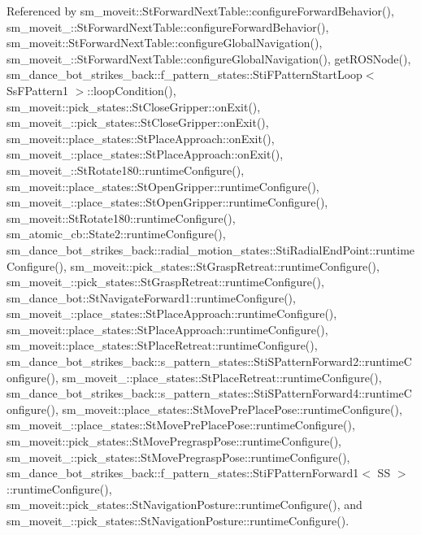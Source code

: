 Referenced by sm\+\_\+moveit\+::\+St\+Forward\+Next\+Table\+::configure\+Forward\+Behavior(), sm\+\_\+moveit\+\_\+::\+St\+Forward\+Next\+Table\+::configure\+Forward\+Behavior(), sm\+\_\+moveit\+::\+St\+Forward\+Next\+Table\+::configure\+Global\+Navigation(), sm\+\_\+moveit\+\_\+::\+St\+Forward\+Next\+Table\+::configure\+Global\+Navigation(), get\+R\+O\+S\+Node(), sm\+\_\+dance\+\_\+bot\+\_\+strikes\+\_\+back\+::f\+\_\+pattern\+\_\+states\+::\+Sti\+F\+Pattern\+Start\+Loop$<$ Ss\+F\+Pattern1 $>$\+::loop\+Condition(), sm\+\_\+moveit\+::pick\+\_\+states\+::\+St\+Close\+Gripper\+::on\+Exit(), sm\+\_\+moveit\+\_\+::pick\+\_\+states\+::\+St\+Close\+Gripper\+::on\+Exit(), sm\+\_\+moveit\+::place\+\_\+states\+::\+St\+Place\+Approach\+::on\+Exit(), sm\+\_\+moveit\+\_\+::place\+\_\+states\+::\+St\+Place\+Approach\+::on\+Exit(), sm\+\_\+moveit\+\_\+::\+St\+Rotate180\+::runtime\+Configure(), sm\+\_\+moveit\+::place\+\_\+states\+::\+St\+Open\+Gripper\+::runtime\+Configure(), sm\+\_\+moveit\+\_\+::place\+\_\+states\+::\+St\+Open\+Gripper\+::runtime\+Configure(), sm\+\_\+moveit\+::\+St\+Rotate180\+::runtime\+Configure(), sm\+\_\+atomic\+\_\+cb\+::\+State2\+::runtime\+Configure(), sm\+\_\+dance\+\_\+bot\+\_\+strikes\+\_\+back\+::radial\+\_\+motion\+\_\+states\+::\+Sti\+Radial\+End\+Point\+::runtime\+Configure(), sm\+\_\+moveit\+::pick\+\_\+states\+::\+St\+Grasp\+Retreat\+::runtime\+Configure(), sm\+\_\+moveit\+\_\+::pick\+\_\+states\+::\+St\+Grasp\+Retreat\+::runtime\+Configure(), sm\+\_\+dance\+\_\+bot\+::\+St\+Navigate\+Forward1\+::runtime\+Configure(), sm\+\_\+moveit\+\_\+::place\+\_\+states\+::\+St\+Place\+Approach\+::runtime\+Configure(), sm\+\_\+moveit\+::place\+\_\+states\+::\+St\+Place\+Approach\+::runtime\+Configure(), sm\+\_\+moveit\+::place\+\_\+states\+::\+St\+Place\+Retreat\+::runtime\+Configure(), sm\+\_\+dance\+\_\+bot\+\_\+strikes\+\_\+back\+::s\+\_\+pattern\+\_\+states\+::\+Sti\+S\+Pattern\+Forward2\+::runtime\+Configure(), sm\+\_\+moveit\+\_\+::place\+\_\+states\+::\+St\+Place\+Retreat\+::runtime\+Configure(), sm\+\_\+dance\+\_\+bot\+\_\+strikes\+\_\+back\+::s\+\_\+pattern\+\_\+states\+::\+Sti\+S\+Pattern\+Forward4\+::runtime\+Configure(), sm\+\_\+moveit\+::place\+\_\+states\+::\+St\+Move\+Pre\+Place\+Pose\+::runtime\+Configure(), sm\+\_\+moveit\+\_\+::place\+\_\+states\+::\+St\+Move\+Pre\+Place\+Pose\+::runtime\+Configure(), sm\+\_\+moveit\+::pick\+\_\+states\+::\+St\+Move\+Pregrasp\+Pose\+::runtime\+Configure(), sm\+\_\+moveit\+\_\+::pick\+\_\+states\+::\+St\+Move\+Pregrasp\+Pose\+::runtime\+Configure(), sm\+\_\+dance\+\_\+bot\+\_\+strikes\+\_\+back\+::f\+\_\+pattern\+\_\+states\+::\+Sti\+F\+Pattern\+Forward1$<$ S\+S $>$\+::runtime\+Configure(), sm\+\_\+moveit\+::pick\+\_\+states\+::\+St\+Navigation\+Posture\+::runtime\+Configure(), and sm\+\_\+moveit\+\_\+::pick\+\_\+states\+::\+St\+Navigation\+Posture\+::runtime\+Configure().


